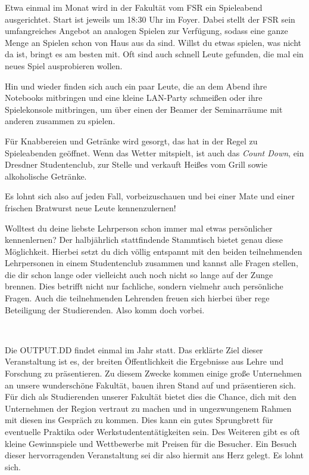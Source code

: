 

Etwa einmal im Monat wird in der Fakultät vom FSR ein Spieleabend ausgerichtet. Start ist jeweils um 18:30 Uhr im Foyer. Dabei stellt der FSR sein umfangreiches Angebot an analogen Spielen zur Verfügung, sodass eine ganze Menge an Spielen schon von Haus aus da sind. Willst du etwas spielen, was nicht da ist, bringt es am besten mit. Oft sind auch schnell Leute gefunden, die mal ein neues Spiel ausprobieren wollen.

Hin und wieder finden sich auch ein paar Leute, die an dem Abend ihre Notebooks mitbringen und eine kleine LAN-Party schmeißen oder ihre Spielekonsole mitbringen, um über einen der Beamer der Seminarräume mit anderen zusammen zu spielen.

Für Knabbereien und Getränke wird gesorgt, das \ascii{} hat in der Regel zu Spieleabenden geöffnet. Wenn das Wetter mitspielt, ist auch das \emph{Count Down}, ein Dresdner Studentenclub, zur Stelle und verkauft Heißes vom Grill sowie alkoholische Getränke.

Es lohnt sich also auf jeden Fall, vorbeizuschauen und bei einer Mate und einer frischen Bratwurst neue Leute kennenzulernen!


Wolltest du deine liebste Lehrperson schon immer mal etwas persönlicher kennenlernen? Der halbjährlich stattfindende Stammtisch bietet genau diese Möglichkeit. Hierbei setzt du dich völlig entspannt mit den beiden teilnehmenden Lehrpersonen in einem Studentenclub zusammen und kannst alle Fragen stellen, die dir schon lange oder vielleicht auch noch nicht so lange auf der Zunge brennen. Dies betrifft nicht nur fachliche, sondern vielmehr auch persönliche Fragen. Auch die teilnehmenden Lehrenden freuen sich hierbei über rege Beteiligung der Studierenden. Also komm doch vorbei.

\pagebreak

\
\thispagestyle{empty}

\pagebreak


Die OUTPUT.DD findet einmal im Jahr statt. Das erklärte Ziel dieser Veranstaltung ist es, der breiten Öffentlichkeit die Ergebnisse aus Lehre und Forschung zu präsentieren. Zu diesem Zwecke kommen einige große Unternehmen an unsere wunderschöne Fakultät, bauen ihren Stand auf und präsentieren sich. Für dich als Studierenden unserer Fakultät bietet dies die Chance, dich mit den Unternehmen der Region vertraut zu machen und in ungezwungenem Rahmen mit diesen ins Gespräch zu kommen. Dies kann ein gutes Sprungbrett für eventuelle Praktika oder Werkstudententätigkeiten sein. Des Weiteren gibt es oft kleine Gewinnspiele und Wettbewerbe mit Preisen für die Besucher. Ein Besuch dieser hervorragenden Veranstaltung sei dir also hiermit ans Herz gelegt. Es lohnt sich.

